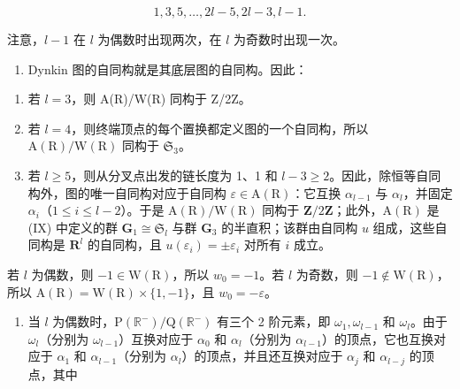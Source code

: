 \[
1, 3, 5, \dots , 2 l - 5, 2 l - 3, l - 1.
\]

注意，\(l - 1\) 在 \(l\) 为偶数时出现两次，在 \(l\) 为奇数时出现一次。

\begin{enumerate}
\def\labelenumi{(\Roman{enumi})}
\setcounter{enumi}{10}
\tightlist
\item
  Dynkin 图的自同构就是其底层图的自同构。因此：
\end{enumerate}

\begin{enumerate}
\def\labelenumi{\arabic{enumi})}
\item
  若 \(l = 3\)，则 A(R)/W(R) 同构于 Z/2Z。
\item
  若 \(l = 4\)，则终端顶点的每个置换都定义图的一个自同构，所以 \(\mathrm{A}(\mathrm{R}) / \mathrm{W}(\mathrm{R})\) 同构于 \(\mathfrak{S}_3\)。
\item
  若 \(l \geqslant 5\)，则从分叉点出发的链长度为 1、1 和 \(l - 3 \geqslant 2\)。因此，除恒等自同构外，图的唯一自同构对应于自同构 \(\varepsilon \in \mathrm{A}(\mathrm{R})\)：它互换 \(\alpha_{l-1}\) 与 \(\alpha_l\)，并固定 \(\alpha_i\)（\(1 \leqslant i \leqslant l - 2\)）。于是 \(\mathrm{A}(\mathrm{R}) / \mathrm{W}(\mathrm{R})\) 同构于 \(\mathbf{Z}/2\mathbf{Z}\)；此外，\(\mathrm{A}(\mathrm{R})\) 是 (IX) 中定义的群 \(\mathbf{G}_1 \cong \mathfrak{S}_l\) 与群 \(\mathbf{G}_3\) 的半直积；该群由自同构 \(u\) 组成，这些自同构是 \(\mathbf{R}^l\) 的自同构，且 \(u(\varepsilon_i) = \pm \varepsilon_i\) 对所有 \(i\) 成立。
\end{enumerate}

若 \(l\) 为偶数，则 \(-1 \in \mathrm{W}(\mathrm{R})\)，所以 \(w_0 = -1\)。若 \(l\) 为奇数，则 \(-1 \notin \mathrm{W}(\mathrm{R})\)，所以 \(\mathrm{A}(\mathrm{R}) = \mathrm{W}(\mathrm{R}) \times \{1, -1\}\)，且 \(w_0 = -\varepsilon\)。

\begin{enumerate}
\def\labelenumi{(\Roman{enumi})}
\setcounter{enumi}{11}
\tightlist
\item
当 \(l\) 为偶数时，\(\mathrm{P}(\mathbb{R}^{-}) / \mathrm{Q}(\mathbb{R}^{-})\) 有三个 2 阶元素，即 \(\omega_{1}, \omega_{l-1}\) 和 \(\omega_{l}\)。由于 \(\omega_{l}\)（分别为 \(\omega_{l-1}\)）互换对应于 \(\alpha_{0}\) 和 \(\alpha_{l}\)（分别为 \(\alpha_{l-1}\)）的顶点，它也互换对应于 \(\alpha_{1}\) 和 \(\alpha_{l-1}\)（分别为 \(\alpha_{l}\)）的顶点，并且还互换对应于 \(\alpha_{j}\) 和 \(\alpha_{l-j}\) 的顶点，其中
\end{enumerate}


